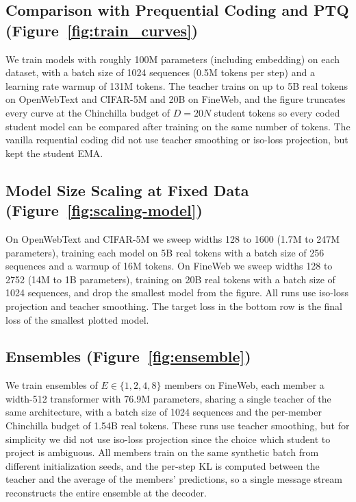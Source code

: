 \documentclass{article}
\theoremstyle{plain}
\theoremstyle{definition}
\theoremstyle{remark}
\begin{document}
\subsection{Comparison with Prequential Coding and PTQ (Figure~\ref{fig:train_curves})}
We train models with roughly 100M parameters (including embedding) on each dataset, with a batch size of 1024 sequences (0.5M tokens per step) and a learning rate warmup of 131M tokens. The teacher trains on up to 5B real tokens on OpenWebText and CIFAR-5M and 20B on FineWeb, and the figure truncates every curve at the Chinchilla budget of $D = 20N$ student tokens so every coded student model can be compared after training on the same number of tokens. The vanilla requential coding did not use teacher smoothing or iso-loss projection, but kept the student EMA.

\subsection{Model Size Scaling at Fixed Data (Figure~\ref{fig:scaling-model})}
On OpenWebText and CIFAR-5M we sweep widths 128 to 1600 (1.7M to 247M parameters), training each model on 5B real tokens with a batch size of 256 sequences and a warmup of 16M tokens. On FineWeb we sweep widths 128 to 2752 (14M to 1B parameters), training on 20B real tokens with a batch size of 1024 sequences, and drop the smallest model from the figure. All runs use iso-loss projection and teacher smoothing. The target loss in the bottom row is the final loss of the smallest plotted model.

\subsection{Ensembles (Figure~\ref{fig:ensemble})}
We train ensembles of $E \in \{1, 2, 4, 8\}$ members on FineWeb, each member a width-512 transformer with 76.9M parameters, sharing a single teacher of the same architecture, with a batch size of 1024 sequences and the per-member Chinchilla budget of 1.54B real tokens. These runs use teacher smoothing, but for simplicity we did not use iso-loss projection since the choice which student to project is ambiguous. All members train on the same synthetic batch from different initialization seeds, and the per-step KL is computed between the teacher and the average of the members' predictions, so a single message stream reconstructs the entire ensemble at the decoder.
\end{document}
